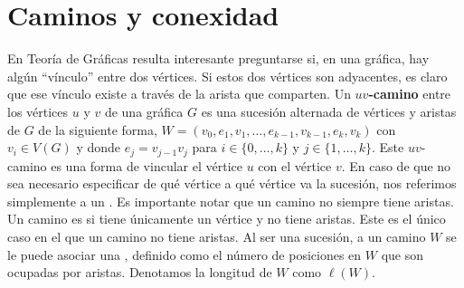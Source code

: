 \section{Caminos y conexidad}
\label{sec:CamConex}

En Teor\'ia de Gr\'aficas resulta interesante preguntarse si, en una gr\'afica,
hay alg\'un ``v\'inculo'' entre dos v\'ertices. Si estos dos v\'ertices son
adyacentes, es claro que ese v\'inculo existe a trav\'es de la arista que
comparten. Un $uv$\textbf{-camino} entre los v\'ertices
$u$ y $v$ de una gr\'afica $G$ es una sucesi\'on alternada de v\'ertices y
aristas de $G$ de la siguiente forma, $W=(v_0, e_1,v_1, \dots, e_{k-1},v_{k-1},
e_k,v_k)$ con $v_i \in V(G)$ y donde $e_j = v_{j-1}v_j$ para $i \in \{0, \dots,
k\}$ y $j \in \{ 1, \dots, k\}$. Este $uv$-camino es una forma de vincular el
v\'ertice $u$ con el v\'ertice $v$. En caso de que no sea necesario especificar
de qu\'e v\'ertice a qu\'e v\'ertice va la sucesi\'on, nos referimos simplemente
a un . Es importante notar que un camino no siempre tiene
aristas. Un camino es  si tiene \'unicamente un
v\'ertice y no tiene aristas. Este es el \'unico caso en el que un camino no
tiene aristas. Al ser una sucesi\'on, a un camino $W$ se le puede asociar una
, definido como el n\'umero de posiciones en $W$ que
son ocupadas por aristas. Denotamos la longitud de $W$ como $\ell(W)$. 

